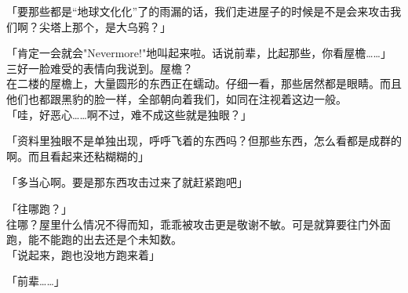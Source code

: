 「要那些都是“地球文化化”了的雨漏的话，我们走进屋子的时候是不是会来攻击我们啊？尖塔上那个，是大乌鸦？」

「肯定一会就会"Nevermore!"地叫起来啦。话说前辈，比起那些，你看屋檐……」\\

三好一脸难受的表情向我说到。屋檐？\\

在二楼的屋檐上，大量圆形的东西正在蠕动。仔细一看，那些居然都是眼睛。而且他们也都跟黑豹的脸一样，全部朝向着我们，如同在注视着这边一般。\\

「哇，好恶心……啊不过，难不成这些就是独眼？」

「资料里独眼不是单独出现，呼呼飞着的东西吗？但那些东西，怎么看都是成群的啊。而且看起来还粘糊糊的」

「多当心啊。要是那东西攻击过来了就赶紧跑吧」

「往哪跑？」\\

往哪？屋里什么情况不得而知，乖乖被攻击更是敬谢不敏。可是就算要往门外面跑，能不能跑的出去还是个未知数。\\

「说起来，跑也没地方跑来着」

「前辈……」\\

